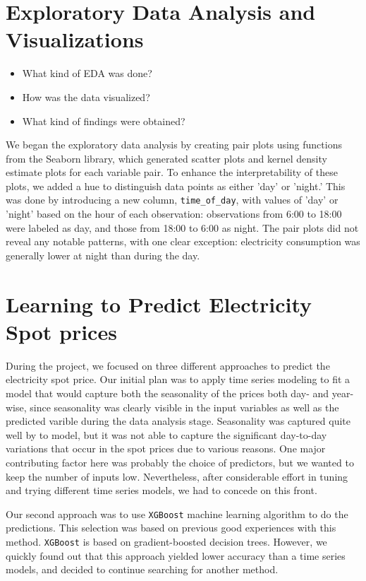 \documentclass{article}
\numberwithin{equation}{section}
\begin{document}
\section{Exploratory Data Analysis and Visualizations}
\begin{itemize}
	\item What kind of EDA was done?
	\item How was the data visualized?
	\item What kind of findings were obtained?
\end{itemize}
We began the exploratory data analysis by creating pair plots using functions from the Seaborn library, which generated scatter plots and kernel density estimate plots for each variable pair. To enhance the interpretability of these plots, we added a hue to distinguish data points as either 'day' or 'night.' This was done by introducing a new column, \verb|time_of_day|, with values of 'day' or 'night' based on the hour of each observation: observations from 6:00 to 18:00 were labeled as day, and those from 18:00 to 6:00 as night. The pair plots did not reveal any notable patterns, with one clear exception: electricity consumption was generally lower at night than during the day.

\section{Learning to Predict Electricity Spot prices}
During the project, we focused on three different approaches to predict the electricity spot price. Our initial plan was to apply time series modeling to fit a model that would capture both the seasonality of the prices both day- and year-wise, since seasonality was clearly visible in the input variables as well as the predicted varible during the data analysis stage. Seasonality was captured quite well by to model, but it was not able to capture the significant day-to-day variations that occur in the spot prices due to various reasons. One major contributing factor here was probably the choice of predictors, but we wanted to keep the number of inputs low. Nevertheless, after considerable effort in tuning and trying different time series models, we had to concede on this front.

Our second approach was to use \verb|XGBoost| machine learning algorithm to do the predictions. This selection was based on previous good experiences with this method. \verb|XGBoost| is based on gradient-boosted decision trees. However, we quickly found out that this approach yielded lower accuracy than a time series models, and decided to continue searching for another method.
\end{document}
